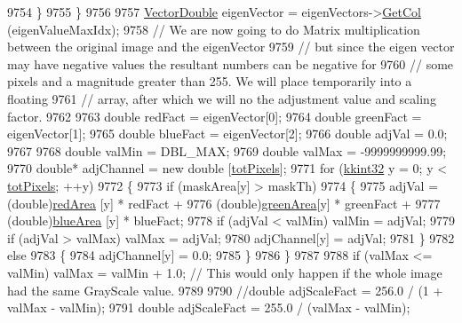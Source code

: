 \begin{DoxyCode}
9754     \}
9755   \}
9756 
9757   \hyperlink{namespace_k_k_b_a5906c207479607e5f450434095914a41}{VectorDouble}  eigenVector = eigenVectors->\hyperlink{class_k_k_b_1_1_matrix_aa0e75f188938ed8b108999e432704c6f}{GetCol} (eigenValueMaxIdx);
9758   \textcolor{comment}{// We are now going to do Matrix multiplication between the original image and the eigenVector}
9759   \textcolor{comment}{// but since the eigen vector may have negative values the resultant numbers can be negative for}
9760   \textcolor{comment}{// some pixels and a magnitude greater than 255.  We will place temporarily into a floating }
9761   \textcolor{comment}{// array,  after which we will no the adjustment value and scaling factor.}
9762 
9763   \textcolor{keywordtype}{double}  redFact   = eigenVector[0];
9764   \textcolor{keywordtype}{double}  greenFact = eigenVector[1];
9765   \textcolor{keywordtype}{double}  blueFact  = eigenVector[2];
9766   \textcolor{keywordtype}{double}  adjVal    = 0.0;
9767 
9768   \textcolor{keywordtype}{double}  valMin = DBL\_MAX;
9769   \textcolor{keywordtype}{double}  valMax = -9999999999.99;
9770   \textcolor{keywordtype}{double}*  adjChannel = \textcolor{keyword}{new} \textcolor{keywordtype}{double} [\hyperlink{class_k_k_b_1_1_raster_a9b08c4a0ca0a35435a478599635f1dc0}{totPixels}];
9771   \textcolor{keywordflow}{for}  (\hyperlink{namespace_k_k_b_a8fa4952cc84fda1de4bec1fbdd8d5b1b}{kkint32} y = 0;  y < \hyperlink{class_k_k_b_1_1_raster_a9b08c4a0ca0a35435a478599635f1dc0}{totPixels};  ++y)
9772   \{
9773     \textcolor{keywordflow}{if}  (maskArea[y] > maskTh)
9774     \{
9775       adjVal = (double)\hyperlink{class_k_k_b_1_1_raster_aaef16f7d4dc7c8b99e84176d0babd731}{redArea}  [y] * redFact    +
9776                (\textcolor{keywordtype}{double})\hyperlink{class_k_k_b_1_1_raster_ad981258f1f7284a8bd0cd0466f328cdf}{greenArea}[y] * greenFact  +
9777                (double)\hyperlink{class_k_k_b_1_1_raster_af7996dfe61613e5ecf91454175bfe3f1}{blueArea} [y] * blueFact;
9778       \textcolor{keywordflow}{if}  (adjVal < valMin)  valMin = adjVal;
9779       \textcolor{keywordflow}{if}  (adjVal > valMax)  valMax = adjVal;
9780       adjChannel[y] = adjVal;
9781     \}
9782     \textcolor{keywordflow}{else}
9783     \{
9784       adjChannel[y] = 0.0;
9785     \}
9786   \}
9787 
9788   \textcolor{keywordflow}{if}  (valMax <= valMin)  valMax = valMin + 1.0;   \textcolor{comment}{// This would only happen if the whole image had the
       same GrayScale value.}
9789 
9790   \textcolor{comment}{//double  adjScaleFact = 256.0 / (1 + valMax - valMin);}
9791   \textcolor{keywordtype}{double}  adjScaleFact = 255.0 / (valMax - valMin);

\end{DoxyCode}
